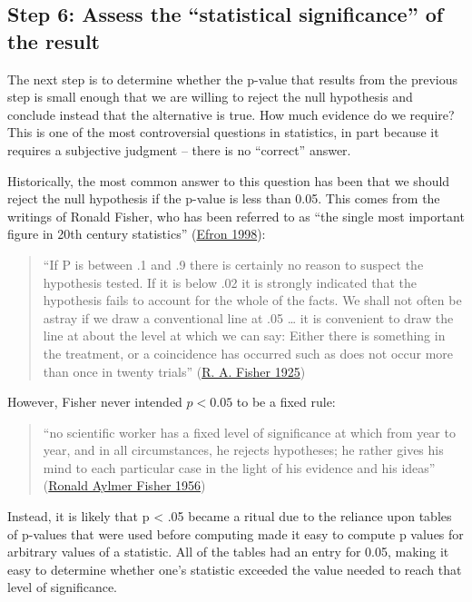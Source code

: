 \documentclass[
  12pt,
]{book}
\begin{document}
\hypertarget{step-6-assess-the-statistical-significance-of-the-result}{%
\subsection{Step 6: Assess the ``statistical significance'' of the result}\label{step-6-assess-the-statistical-significance-of-the-result}}

The next step is to determine whether the p-value that results from the previous step is small enough that we are willing to reject the null hypothesis and conclude instead that the alternative is true. How much evidence do we require? This is one of the most controversial questions in statistics, in part because it requires a subjective judgment -- there is no ``correct'' answer.

Historically, the most common answer to this question has been that we should reject the null hypothesis if the p-value is less than 0.05. This comes from the writings of Ronald Fisher, who has been referred to as ``the single most important figure in 20th century statistics'' (\protect\hyperlink{ref-efron1998}{Efron 1998}):

\begin{quote}
``If P is between .1 and .9 there is certainly no reason to suspect the hypothesis tested. If it is below .02 it is strongly indicated that the hypothesis fails to account for the whole of the facts. We shall not often be astray if we draw a conventional line at .05 \ldots{} it is convenient to draw the line at about the level at which we can say: Either there is something in the treatment, or a coincidence has occurred such as does not occur more than once in twenty trials'' (\protect\hyperlink{ref-fisher1925statistical}{R. A. Fisher 1925})
\end{quote}

However, Fisher never intended \(p < 0.05\) to be a fixed rule:

\begin{quote}
``no scientific worker has a fixed level of significance at which from year to year, and in all circumstances, he rejects hypotheses; he rather gives his mind to each particular case in the light of his evidence and his ideas'' (\protect\hyperlink{ref-fish:1956}{Ronald Aylmer Fisher 1956})
\end{quote}

Instead, it is likely that p \textless{} .05 became a ritual due to the reliance upon tables of p-values that were used before computing made it easy to compute p values for arbitrary values of a statistic. All of the tables had an entry for 0.05, making it easy to determine whether one's statistic exceeded the value needed to reach that level of significance.
\end{document}
